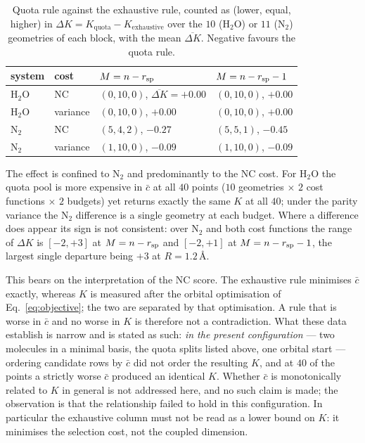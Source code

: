 \begin{table}[htbp]
\centering
\begin{tabular}{llll}
\hline
system & cost & $M=n-r_{\mathrm{sp}}$ & $M=n-r_{\mathrm{sp}}-1$\\
\hline
$\mathrm{H_2O}$ & NC       & $(0,10,0)$, $\overline{\Delta K}=+0.00$ & $(0,10,0)$, $+0.00$\\
$\mathrm{H_2O}$ & variance & $(0,10,0)$, $+0.00$ & $(0,10,0)$, $+0.00$\\
$\mathrm{N_2}$  & NC       & $(5,4,2)$, $-0.27$ & $(5,5,1)$, $-0.45$\\
$\mathrm{N_2}$  & variance & $(1,10,0)$, $-0.09$ & $(1,10,0)$, $-0.09$\\
\hline
\end{tabular}
\caption{Quota rule against the exhaustive rule, counted as
(lower, equal, higher) in $\Delta K=K_{\mathrm{quota}}-K_{\mathrm{exhaustive}}$
over the $10$ ($\mathrm{H_2O}$) or $11$ ($\mathrm{N_2}$) geometries of each
block, with the mean $\overline{\Delta K}$. Negative favours the quota rule.}
\label{tab:dk}
\end{table}

The effect is confined to $\mathrm{N_2}$ and predominantly to the NC cost. For
$\mathrm{H_2O}$ the quota pool is more expensive in $\bar c$ at all $40$ points
($10$ geometries $\times$ $2$ cost functions $\times$ $2$ budgets) yet returns
exactly the same $K$ at all $40$; under the parity variance the $\mathrm{N_2}$
difference is a single geometry at each budget. Where a difference does appear
its sign is not consistent: over $\mathrm{N_2}$ and both cost functions the
range of $\Delta K$ is $[-2,+3]$ at $M=n-r_{\mathrm{sp}}$ and $[-2,+1]$ at $M=n-r_{\mathrm{sp}}-1$,
the largest single departure being $+3$ at $R=1.2$\,\AA.

This bears on the interpretation of the NC score. The exhaustive rule minimises
$\bar c$ exactly, whereas $K$ is measured after the orbital optimisation of
Eq.~\eqref{eq:objective}; the two are separated by that optimisation. A rule
that is worse in $\bar c$ and no worse in $K$ is therefore not a contradiction.
What these data establish is narrow and is stated as such: \emph{in the present
configuration} --- two molecules in a minimal basis, the quota splits listed
above, one orbital start --- ordering candidate rows by $\bar c$ did not order
the resulting $K$, and at $40$ of the points a strictly worse $\bar c$ produced
an identical $K$. Whether $\bar c$ is monotonically related to $K$ in general
is not addressed here, and no such claim is made; the observation is that the
relationship failed to hold in this configuration. In particular the exhaustive
column must not be read as a lower bound on $K$: it minimises the selection
cost, not the coupled dimension.

